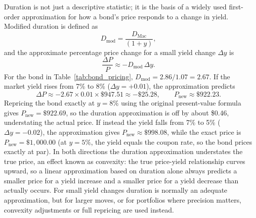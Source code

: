 \documentclass[../ai_in_finance]{subfiles}
\begin{document}
Duration is not just a descriptive statistic; it is the basis of a widely used first-order approximation for how a bond's
price responds to a change in yield. Modified duration is defined as
$$D_{\text{mod}} = \frac{D_{\text{Mac}}}{(1+y)},$$
and the approximate percentage price change for a small yield change $\Delta y$ is
\begin{equation*}
\frac{\Delta P}{P} \approx -D_{\text{mod}} \, \Delta y.
\end{equation*}
For the bond in Table~\ref{tab:bond_pricing}, $D_{\text{mod}} = 2.86 / 1.07 = 2.67$. If the market yield rises from 7\% to 8\% ($\Delta y = +0.01$), the approximation predicts
\begin{equation*}
\Delta P \approx -2.67 \times 0.01 \times \$947.51 \approx -\$25.28, \qquad P_{\text{new}} \approx \$922.23.
\end{equation*}
Repricing the bond exactly at $y=8\%$ using the original present-value formula gives $P_{\text{new}} = \$922.69$, so the duration approximation is off by about \$0.46, understating the actual price. If instead the yield falls from 7\% to 5\% ($\Delta y = -0.02$), the approximation gives $P_{\text{new}} \approx \$998.08$, while the exact price is $P_{\text{new}} = \$1{,}000.00$ (at $y=5\%$, the yield equals the coupon rate, so the bond prices exactly at par). In both directions the duration approximation understates the true price, an effect known as convexity: the true price-yield relationship curves upward, so a linear approximation based on duration alone always predicts a smaller price for a yield increase and a smaller price for a yield decrease than actually occurs. For small yield changes duration is normally an adequate approximation, but for larger moves, or for portfolios where precision matters, convexity adjustments or full repricing are used instead.
\end{document}
